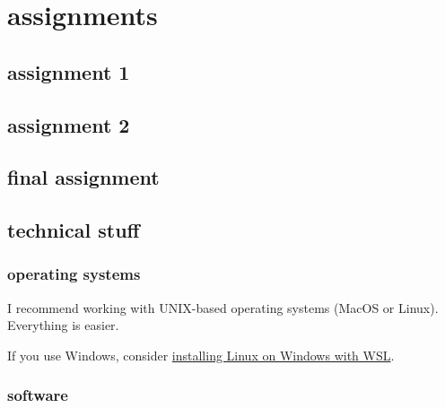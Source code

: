 \documentclass[
  letterpaper,
  DIV=11,
  numbers=noendperiod,
  oneside]{scrreprt}
\begin{document}
\part{assignments}

\hypertarget{assignment-1}{%
\chapter{assignment 1}\label{assignment-1}}

\hypertarget{assignment-2}{%
\chapter{assignment 2}\label{assignment-2}}

\hypertarget{final-assignment}{%
\chapter{final assignment}\label{final-assignment}}


\hypertarget{technical-stuff}{%
\chapter*{technical stuff}\label{technical-stuff}}


\hypertarget{operating-systems}{%
\section*{operating systems}\label{operating-systems}}


I recommend working with UNIX-based operating systems (MacOS or Linux).
Everything is easier.

If you use Windows, consider
\href{https://learn.microsoft.com/en-us/windows/wsl/install}{installing
Linux on Windows with WSL}.

\hypertarget{software}{%
\section*{software}\label{software}}

\end{document}

